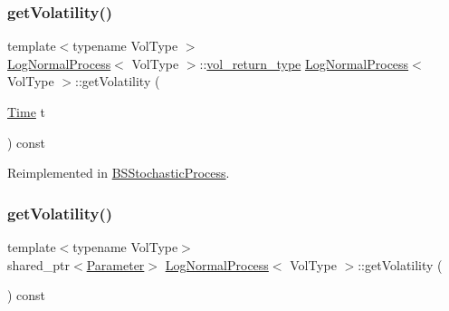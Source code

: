 \subsubsection{\texorpdfstring{get\+Volatility()}{getVolatility()}\hspace{0.1cm}{\footnotesize\ttfamily [1/2]}}
{\footnotesize\ttfamily template$<$typename Vol\+Type $>$ \\
\hyperlink{class_log_normal_process}{Log\+Normal\+Process}$<$ Vol\+Type $>$\+::\hyperlink{class_log_normal_process_a160d9cd152962a42ac9fc016d0948c1c}{vol\+\_\+return\+\_\+type} \hyperlink{class_log_normal_process}{Log\+Normal\+Process}$<$ Vol\+Type $>$\+::get\+Volatility (\begin{DoxyParamCaption}\item[{\hyperlink{_name_def_8h_ac2d3e0ba793497bcca555c7c2cf64ff3}{Time}}]{t }\end{DoxyParamCaption}) const\hspace{0.3cm}{\ttfamily [virtual]}}



Reimplemented in \hyperlink{class_b_s_stochastic_process_ad20afb9e82ee123452a7d828837289f6}{B\+S\+Stochastic\+Process}.

\hypertarget{class_log_normal_process_a7860abf96c754c037531680cb0dde6ff}{}\label{class_log_normal_process_a7860abf96c754c037531680cb0dde6ff} 
\subsubsection{\texorpdfstring{get\+Volatility()}{getVolatility()}\hspace{0.1cm}{\footnotesize\ttfamily [2/2]}}
{\footnotesize\ttfamily template$<$typename Vol\+Type$>$ \\
shared\+\_\+ptr$<$\hyperlink{class_parameter}{Parameter}$>$ \hyperlink{class_log_normal_process}{Log\+Normal\+Process}$<$ Vol\+Type $>$\+::get\+Volatility (\begin{DoxyParamCaption}{ }\end{DoxyParamCaption}) const\hspace{0.3cm}{\ttfamily [inline]}}

\hypertarget{class_log_normal_process_a708854438eccd5ed5d1a996c5f0b6ff8}{}\label{class_log_normal_process_a708854438eccd5ed5d1a996c5f0b6ff8} 
